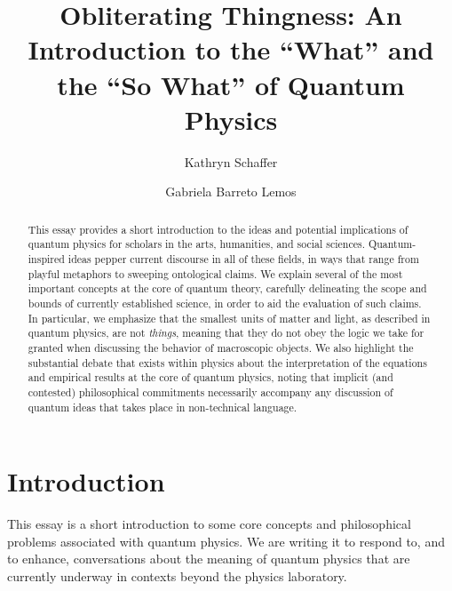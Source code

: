 \documentclass[12pt,onecolumn,preprintnumbers,amsmath,amssymbn,reprint,nofootinbib,superscriptaddress]{revtex4}    %
\begin{document}
\title{Obliterating Thingness: An Introduction to the ``What'' and the ``So What'' of Quantum Physics}

\author{Kathryn Schaffer}

\author{Gabriela Barreto Lemos}



\begin{abstract}
This essay provides a short introduction to the ideas and potential implications of quantum physics for scholars in the arts, humanities, and social sciences.  Quantum-inspired ideas pepper current discourse in all of these fields, in ways that range from playful metaphors to sweeping ontological claims.  We explain several of the most important concepts at the core of quantum theory, carefully delineating the scope and bounds of currently established science, in order to aid the evaluation of such claims.  In particular, we emphasize that the smallest units of matter and light, as described in quantum physics, are not {\em things}, meaning that they do not obey the logic we take for granted when discussing the behavior of macroscopic objects.  We also highlight the substantial debate that exists within physics about the interpretation of the equations and empirical results at the core of quantum physics, noting that implicit (and contested) philosophical commitments necessarily accompany any discussion of quantum ideas that takes place in non-technical language.
\end{abstract}
\maketitle
\section{Introduction}
\label{intro}
This essay is a short introduction to some core concepts and philosophical problems associated with quantum physics. We are writing it to respond to, and to enhance, conversations about the meaning of quantum physics that are currently underway in contexts beyond the physics laboratory.  
\end{document}
